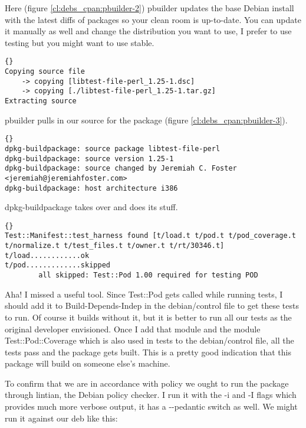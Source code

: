 Here (f\hbox{}igure \ref{cl:debs_cpan:pbuilder-2}) pbuilder updates the base Debian
install with the latest dif\hbox{}fs of packages so your clean room is up-to-date. You
can update it manually as well and change the distribution you want to use, I
prefer to use testing but you might want to use stable.

\begin{lstlisting}[frame=trbl,label=cl:debs_cpan:pbuilder-3,caption=pbuilder process continued]{}
Copying source file
    -> copying [libtest-file-perl_1.25-1.dsc]
    -> copying [./libtest-file-perl_1.25-1.tar.gz]
Extracting source
\end{lstlisting}

pbuilder pulls in our source for the package (f\hbox{}igure
\ref{cl:debs_cpan:pbuilder-3}).

\begin{lstlisting}[frame=trbl,label=cl:debs_cpan:pbuilder-4,caption=dpkg-buildpackage takes over]{}
dpkg-buildpackage: source package libtest-file-perl
dpkg-buildpackage: source version 1.25-1
dpkg-buildpackage: source changed by Jeremiah C. Foster <jeremiah@jeremiahfoster.com>
dpkg-buildpackage: host architecture i386
\end{lstlisting}

dpkg-buildpackage takes over and does its stuf\hbox{}f.

\begin{lstlisting}[frame=trbl,label=cl:debs_cpan:pbuilder-5,caption=Test failure!]{}
Test::Manifest::test_harness found [t/load.t t/pod.t t/pod_coverage.t t/normalize.t t/test_files.t t/owner.t t/rt/30346.t]
t/load............ok                                                         
t/pod.............skipped
        all skipped: Test::Pod 1.00 required for testing POD
\end{lstlisting}

Aha! I missed a useful tool. Since Test::Pod gets called while running tests, I
should add it to Build-Depends-Indep in the debian/control f\hbox{}ile to get these
tests to run. Of course it builds without it, but it is better to run all our
tests as the original developer envisioned. Once I add that module and the
module Test::Pod::Coverage which is also used in tests to the debian/control
f\hbox{}ile, all the tests pass and the package gets built. This is a pretty good
indication that this package will build on someone else's machine.

To conf\hbox{}irm that we are in accordance with policy we ought to run the package
through lintian, the Debian policy checker. I run it with the -i and -I f\hbox{}lags
which provides much more verbose output, it has a {-}{-}pedantic switch as well.
We might run it against our deb like this:

